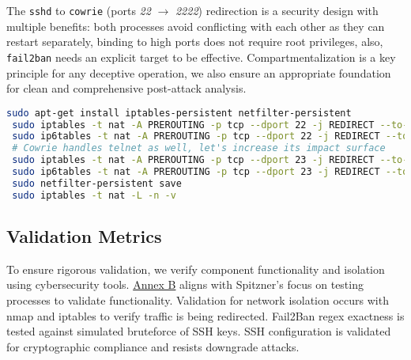 \documentclass{cls/ULBreport}
\begin{document}
        The \texttt{sshd} to \texttt{cowrie} ({ports \textit{22}} $\rightarrow$ \textit{2222}) redirection is a security design with multiple benefits: both processes avoid conflicting with each other as they can restart separately, binding to high ports does not require root privileges, also, \texttt{fail2ban} needs an explicit target to be effective. Compartmentalization is a key principle for any deceptive operation, we also ensure an appropriate foundation for clean and comprehensive post-attack analysis.
        \begin{lstlisting}[language=bash,caption={Traffic Redirection to Cowrie}]
 sudo apt-get install iptables-persistent netfilter-persistent
 sudo iptables -t nat -A PREROUTING -p tcp --dport 22 -j REDIRECT --to-port 2222
 sudo ip6tables -t nat -A PREROUTING -p tcp --dport 22 -j REDIRECT --to-port 2222
 # Cowrie handles telnet as well, let's increase its impact surface
 sudo iptables -t nat -A PREROUTING -p tcp --dport 23 -j REDIRECT --to-port 2323
 sudo ip6tables -t nat -A PREROUTING -p tcp --dport 23 -j REDIRECT --to-port 2323
 sudo netfilter-persistent save
 sudo iptables -t nat -L -n -v\end{lstlisting}
        

        
        \subsection{Validation Metrics}  
        \label{sec:validation}  
        
        To ensure rigorous validation, we verify component functionality and isolation using cybersecurity tools. \hyperref[annex:network]{Annex B} aligns with Spitzner's focus on testing processes to validate functionality. Validation for network isolation occurs with nmap and iptables to verify traffic is being redirected. Fail2Ban regex exactness is tested against simulated bruteforce of SSH keys. SSH configuration is validated for cryptographic compliance and resists downgrade attacks.
        
\end{document}
